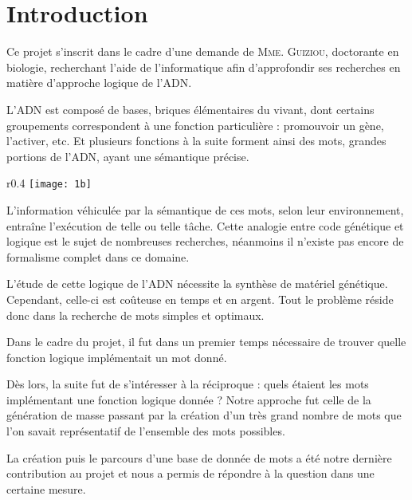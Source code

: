 \part*{Introduction}
\label{introduction}
\markright{}
\par
Ce projet s'inscrit dans le cadre d'une demande de \textsc{Mme. Guiziou}, doctorante en biologie, recherchant l'aide de l'informatique afin d'approfondir ses recherches en matière d'approche logique de l'ADN.

\par
L'ADN est composé de bases, briques élémentaires du vivant, dont certains groupements correspondent à une fonction particulière : promouvoir un gène, l'activer, etc. Et plusieurs fonctions à la suite forment ainsi des mots, grandes portions de l'ADN, ayant une sémantique précise.

\begin{wrapfigure}{r}{0.4\textwidth}
\texttt{[image: 1b]}
\end{wrapfigure}

\par
L'information véhiculée par la sémantique de ces mots, selon leur environnement, entraîne l'exécution de telle ou telle tâche. Cette analogie entre code génétique et logique est le sujet de nombreuses recherches, néanmoins il n'existe pas encore de formalisme complet dans ce domaine.

\par
L'étude de cette logique de l'ADN nécessite la synthèse de matériel génétique. Cependant, celle-ci est coûteuse en temps et en argent. Tout le problème réside donc dans la recherche de mots simples et optimaux.

\par
Dans le cadre du projet, il fut dans un premier temps nécessaire de trouver quelle fonction logique implémentait un mot donné.

\par
Dès lors, la suite fut de s'intéresser à la réciproque : quels étaient les mots implémentant une fonction logique donnée ? Notre approche fut celle de la génération de masse passant par la création d'un très grand nombre de mots que l'on savait représentatif de l'ensemble des mots possibles.

\par
La création puis le parcours d'une base de donnée de mots a été notre dernière contribution au projet et nous a permis de répondre à la question dans une certaine mesure.